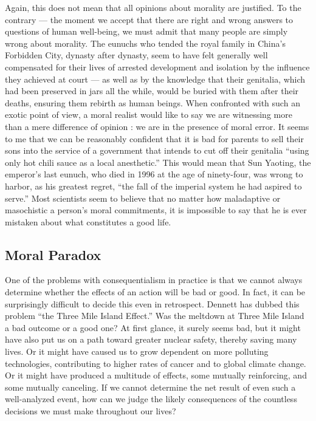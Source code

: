 \documentclass[a4paper,14pt]{extarticle}
\begin{document}
Again, this does not mean that all opinions about morality are justified.
To the contrary --- the moment we accept that there are right and wrong answers to questions of human well-being, we must admit that many people are simply wrong about morality.
The eunuchs who tended the royal family in China's Forbidden City, dynasty after dynasty, seem to have felt generally well compensated for their lives of arrested development and isolation by the influence they achieved at court --- as well as by the knowledge that their genitalia, which had been preserved in jars all the while, would be buried with them after their deaths, ensuring them rebirth as human beings.
When confronted with such an exotic point of view, a moral realist would like to say we are witnessing more than a mere difference of opinion :
we are in the presence of moral error.
It seems to me that we can be reasonably confident that it is bad for parents to sell their sons into the service of a government that intends to cut off their genitalia ``using only hot chili sauce as a local anesthetic.''
This would mean that Sun Yaoting, the emperor's last eunuch, who died in 1996 at the age of ninety-four, was wrong to harbor, as his greatest regret, ``the fall of the imperial system he had aspired to serve.''
Most scientists seem to believe that no matter how maladaptive or masochistic a person's moral commitments, it is impossible to say that he is ever mistaken about what constitutes a good life.

\subsection{Moral Paradox}

One of the problems with consequentialism in practice is that we cannot always determine whether the effects of an action will be bad or good.
In fact, it can be surprisingly difficult to decide this even in retrospect.
Dennett has dubbed this problem ``the Three Mile Island Effect.''
Was the meltdown at Three Mile Island a bad outcome or a good one?
At first glance, it surely seems bad, but it might have also put us on a path toward greater nuclear safety, thereby saving many lives.
Or it might have caused us to grow dependent on more polluting technologies, contributing to higher rates of cancer and to global climate change.
Or it might have produced a multitude of effects, some mutually reinforcing, and some mutually canceling.
If we cannot determine the net result of even such a well-analyzed event, how can we judge the likely consequences of the countless decisions we must make throughout our lives?
\end{document}
